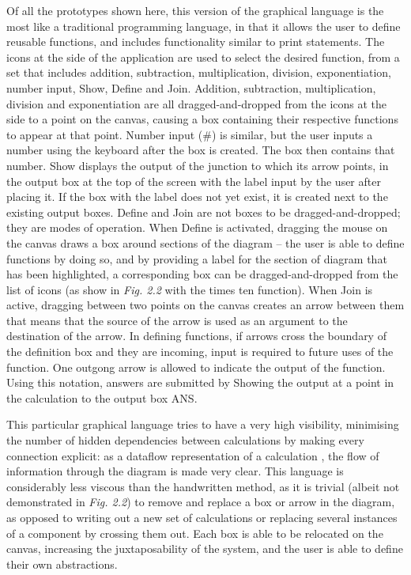 \documentclass[12pt,twoside,notitlepage,xetex]{report}
\begin{document}
Of all the prototypes shown here, this version of the graphical language is the
most like a traditional programming language, in that it allows the user to
define reusable functions, and includes functionality similar to print
statements.  The icons at the side of the application are used to select the
desired function, from a set that includes addition, subtraction,
multiplication, division, exponentiation, number input, {\sfapp Show},
{\sfapp Define} and {\sfapp Join}.  Addition, subtraction, multiplication,
division and exponentiation are all dragged-and-dropped from the icons at the
side to a point on the canvas, causing a box containing their respective
functions to appear at that point.  Number input ({\sfapp \#}) is similar, but
the user inputs a number using the keyboard after the box is created.  The box
then contains that number.  {\sfapp Show} displays the output of the junction to
which its arrow points, in the output box at the top of the screen with the label
input by the user after placing it.  If the box with the label does not yet
exist, it is created next to the existing output boxes.  {\sfapp Define} and
{\sfapp Join} are not boxes to be dragged-and-dropped; they are modes of
operation.  When {\sfapp Define} is activated, dragging the mouse on the canvas
draws a box around sections of the diagram -- the user is able to define
functions by doing so, and by providing a label for the section of diagram that
has been highlighted, a corresponding box can be dragged-and-dropped from the
list of icons (as show in \emph{Fig. 2.2} with the {\sfapp times ten}
function).  When {\sfapp Join} is active, dragging between two points on the
canvas creates an arrow between them that means that the source of the arrow is
used as an argument to the destination of the arrow.  In defining functions,
if arrows cross the boundary of the definition box and they are incoming, input
is required to future uses of the function.  One outgong arrow is allowed to
indicate the output of the function.  Using this notation, answers are submitted
by {\sfapp Show}ing the output at a point in the calculation to the output box
{\sfapp ANS}.

This particular graphical language tries to have a very high visibility,
minimising the number of hidden dependencies between calculations by making
every connection explicit: as a dataflow representation of a calculation
\cite{Blackwell1998}, the flow of information through the diagram is made very
clear.  This language is considerably less viscous than the handwritten method,
as it is trivial (albeit not demonstrated in \emph{Fig. 2.2}) to remove and
replace a box or arrow in the diagram, as opposed to writing out a new set of
calculations or replacing several instances of a component by crossing them
out.  Each box is able to be relocated on the canvas, increasing the
juxtaposability of the system, and the user is able to define their own
abstractions.
\end{document}
